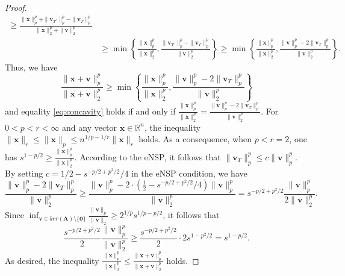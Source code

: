 \documentclass[10pt,a4paper]{amsart}
\begin{document}
\begin{proof}
\begin{equation}
\begin{aligned}
			\geq \frac{\|\bm{x}\|_p^p + \|\bm{v}_{T^c}\|_p^p - \|\bm{v}_T\|_p^p}{\|\bm{x}\|_2^p + \|\bm{v}\|_2^p} \\[5pt]
			&\geq \min\left\{ \frac{\|\bm{x}\|_p^p}{\|\bm{x}\|_2^p}, \frac{\|\bm{v}_{T^c}\|_p^p - \|\bm{v}_T\|_p^p}{\|\bm{v}\|_2^p} \right\} \geq \min\left\{ \frac{\|\bm{x}\|_p^p}{\|\bm{x}\|_2^p}, \frac{\|\bm{v}\|_p^p - 2\|\bm{v}_T\|_p^p}{\|\bm{v}\|_2^p} \right\}.
		\end{aligned}
		\label{eq:concavity-inequality}
	\end{equation}
	Thus, we have 
	\begin{equation}
		\frac{\|\bm{x} + \bm{v}\|_p^p}{\|\bm{x} + \bm{v}\|_2^p}
		\geq \min\left\{\frac{\|\bm{x}\|_p^p}{\|\bm{x}\|_2^p}, \frac{\|\bm{v}\|_p^p - 2\|\bm{v}_T\|_p^p}{\|\bm{v}\|_2^p}\right\}
		\label{eq:concavity}
	\end{equation}
	and equality \cref{eq:concavity} holds if and only if $ 		\frac{\|\bm{x}\|_p^p}{\|\bm{x}\|_2^p} = \frac{\|\bm{v}\|_p^p - 2\|\bm{v}_T\|_p^p}{\|\bm{v}\|_2^p}.$
	For $0 < p < r < \infty$ and any vector $\bm{x} \in \mathbb{R}^n$, the inequality $\|\bm{x}\|_r \le \|\bm{x}\|_p \le n^{1/p - 1/r} \|\bm{x}\|_r$ holds. As a consequence, when $p<r=2$, one has $s^{1 - p/2} \geq \frac{\|\bm{x}\|_p^p}{\|\bm{x}\|_2^p}.$ According to the eNSP, it follows that $\|\bm{v}_T\|_p^p \leq c\|\bm{v}\|_p^p$. By setting $c = 1/2-s^{-p/2+p^2/2}/4$ in the eNSP condition, we have 
	\begin{equation}
		\frac{\|\bm{v}\|_p^p - 2\|\bm{v}_T\|_p^p}{\|\bm{v}\|_2^p} \ge \frac{\|\bm{v}\|_p^p - 2 \cdot \left(\frac{1}{2}-s^{-p/2+p^2/2}/4\right)\|\bm{v}\|_p^p}{\|\bm{v}\|_2^p} =  s^{-p/2+p^2/2}\frac{\|\bm{v}\|_p^p}{2\|\bm{v}\|_2^p}.
	\end{equation}
	Since $\inf_{\bm{v}\in ker(\bm{A})\setminus\{\bm{0}\}}\frac{\|\bm{v}\|_{p}}{\|\bm{v}\|_{2}} \ge 2^{1/p}s^{1/p-p/2}$, it follows that 
	\begin{equation}
		\frac{s^{-p/2+p^2/2}}{2}\frac{\|\bm{v}\|_p^p}{\|\bm{v}\|_2^p} \ge \frac{s^{-p/2+p^2/2}}{2} \cdot 2s^{1-p^2/2} = s^{1-p/2}.
	\end{equation}
	As desired, the inequality $\frac{\|\bm{x}\|_{p}^{p}}{\|\bm{x}\|_{2}^{p}} \leq \frac{\|\bm{x} + \bm{v}\|_{p}^{p}}{\|\bm{x} + \bm{v}\|_{2}^{p}}$ holds.
\end{proof}
\end{document}
